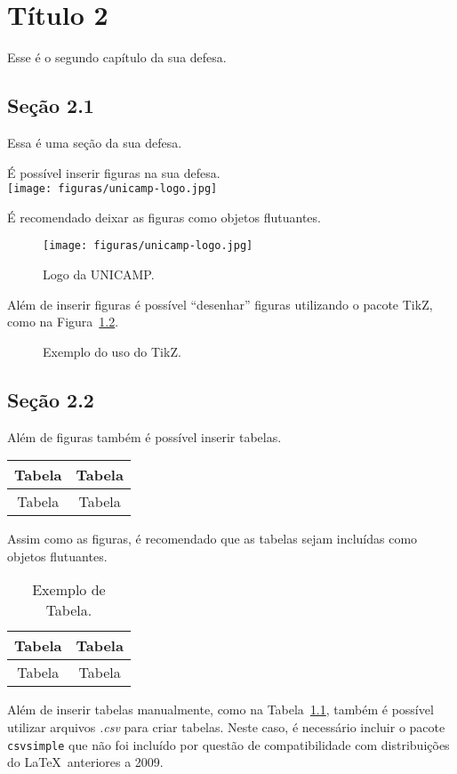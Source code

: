 \chapter{Título 2}
Esse é o segundo capítulo da sua defesa.

\section{Seção 2.1}
Essa é uma seção da sua defesa.

É possível inserir figuras na sua defesa. \\
\texttt{[image: figuras/unicamp-logo.jpg]}

É recomendado deixar as figuras como objetos flutuantes.
\begin{figure}[!htb]
  \center
  \texttt{[image: figuras/unicamp-logo.jpg]}
  \caption{Logo da UNICAMP.}
  \label{fig:log_unicamp}
\end{figure}

Além de inserir figuras é possível ``desenhar'' figuras
utilizando o pacote TikZ, como na Figura~\ref{fig:exem_tikz}.
\begin{figure}[!htb]
  \centering
  \caption{Exemplo do uso do TikZ.}
  \label{fig:exem_tikz}
\end{figure}

\section{Seção 2.2}
Além de figuras também é possível inserir tabelas. \\
\begin{tabular}{cc}
  \toprule
  Tabela & Tabela \\
  \midrule
  Tabela & Tabela \\
  \bottomrule
\end{tabular}

Assim como as figuras, é recomendado que as tabelas sejam incluídas como
objetos flutuantes.
\begin{table}[!htb]
  \caption{Exemplo de Tabela.}
  \label{tab:exem}
  \centering
  \begin{tabular}{cc}
    \toprule
    Tabela & Tabela \\
    \midrule
    Tabela & Tabela \\
    \bottomrule
  \end{tabular}
\end{table}

Além de inserir tabelas manualmente, como na Tabela~\ref{tab:exem}, também é
possível utilizar arquivos \emph{.csv} para criar tabelas. Neste caso, é
necessário incluir o pacote \texttt{csvsimple} que não foi incluído por questão
de compatibilidade com distribuições do \LaTeX \ anteriores a 2009.
